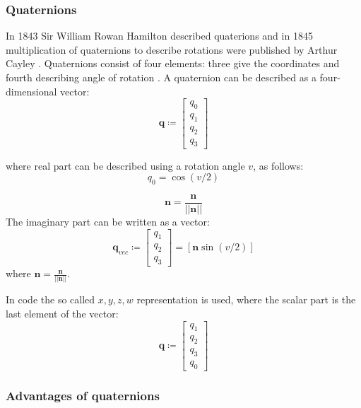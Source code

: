 \documentclass[12pt,a4paper,twoside]{article}
\begin{document}
\subsubsection{Quaternions}

In 1843 Sir William Rowan Hamilton described quaterions \cite{hamilton1844lxxviii} and in 1845 multiplication of quaternions to describe rotations were published by Arthur Cayley \cite{cayley1845xiii}. Quaternions consist of four elements: three give the coordinates and fourth describing angle of rotation \citet{courant1953methods}.
A quaternion can be described as a four-dimensional vector:
\begin{equation}
\bm{q} \coloneqq \begin{bmatrix}
q_0 \\
q_1 \\
q_2 \\
q_3
\end{bmatrix}
\end{equation}

where real part can be described using a rotation angle $v$, as follows:
\begin{equation}
q_0 = \cos(v/2)
\end{equation}

\begin{equation}
\bm{n} = \frac{\bm{n}}{||\bm{n}||}
\end{equation}
The imaginary part can be written as a vector:
\begin{equation}
\bm{q}_{vec} \coloneqq \begin{bmatrix}
q_1 \\
q_2 \\
q_3
\end{bmatrix}
= [\bm{n}\sin(v/2)]
\end{equation}
where $\bm{n} = \frac{\bm{n}}{||\bm{n}||}$.

In code the so called $x,y,z,w$ representation is used, where the scalar part is the last element of the vector:
\begin{equation} \label{eq:code_quaternion}
\bm{q} \coloneqq \begin{bmatrix}
q_1 \\
q_2 \\
q_3 \\
q_0
\end{bmatrix}
\end{equation}

\subsubsection{Advantages of quaternions}
\end{document}
